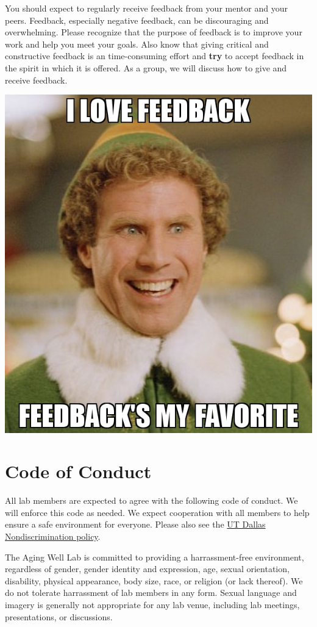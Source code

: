 \documentclass[]{book}
\begin{document}
You should expect to regularly receive feedback from your mentor and your peers. Feedback, especially negative feedback, can be discouraging and overwhelming. Please recognize that the purpose of feedback is to improve your work and help you meet your goals. Also know that giving critical and constructive feedback is an time-consuming effort and \textbf{try} to accept feedback in the spirit in which it is offered. As a group, we will discuss how to give and receive feedback.

\includegraphics{images/i-love-feedback.jpg}

\hypertarget{code-of-conduct}{%
\chapter{Code of Conduct}\label{code-of-conduct}}

All lab members are expected to agree with the following code of conduct. We will enforce this code as needed. We expect cooperation with all members to help ensure a safe environment for everyone. Please also see the \href{https://policy.utdallas.edu/utdbp3090}{UT Dallas Nondiscrimination policy}.

The Aging Well Lab is committed to providing a harrassment-free environment, regardless of gender, gender identity and expression, age, sexual orientation, disability, physical appearance, body size, race, or religion (or lack thereof). We do not tolerate harrassment of lab members in any form. Sexual language and imagery is generally not appropriate for any lab venue, including lab meetings, presentations, or discussions.
\end{document}
